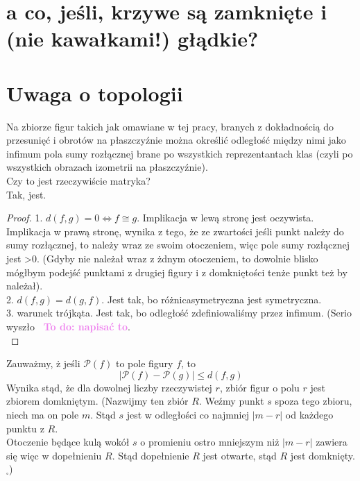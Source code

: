 \documentclass[a4paper, 12pt]{article}
\newcommand{\smalltodoII}[1]{\hfill \break \textbf{\ \textcolor{violet}{To do: #1}}\hfill \break}
\begin{document}
\section{a co, jeśli, krzywe są zamknięte i (nie kawałkami!) głądkie?}

\section{Uwaga o topologii}
Na zbiorze figur takich jak omawiane w tej pracy, branych z dokładnością do przesunięć i obrotów na
płaszczyźnie można określić odległość między nimi jako infimum pola sumy rozłącznej brane po wszystkich
reprezentantach klas (czyli po wszystkich obrazach izometrii na płaszczyźnie). \\
Czy to jest rzeczywiście matryka? \\
Tak, jest. \\
\begin{proof}
    1. $d(f,g) = 0 \iff f \cong g$. Implikacja w lewą stronę jest oczywista. Implikacja w prawą stronę,
    wynika z tego, że ze zwartości jeśli punkt należy do sumy rozłącznej, to należy wraz ze swoim otoczeniem,
     więc pole sumy rozłącznej jest >0. (Gdyby nie należał wraz z żdnym otoczeniem, to dowolnie blisko
     mógłbym podejść punktami z drugiej figury i z domkniętości tenże punkt też by należał). \\
     2. $d(f,g ) = d(g,f)$. Jest tak, bo różnicasymetryczna jest symetryczna. \\
     3. warunek trójkąta. Jest tak, bo odległość zdefiniowaliśmy przez infimum. (Serio wyszło
     \smalltodoII{napisać to}. \\

\end{proof}
Zauważmy, ż jeśli $\mathcal{P}(f)$ to pole figury $f$, to
\begin{equation}
    |\mathcal{P}(f) - \mathcal{P}(g)| \leq d(f, g)
\end{equation}
Wynika stąd, że dla dowolnej liczby rzeczywistej $r$, zbiór figur o polu $r$ jest zbiorem domkniętym.
(Nazwijmy ten zbiór $R$. Weźmy punkt $s$ spoza tego zbioru, niech ma on pole $m$.
Stąd $s$ jest w odległości co najmniej $|m-r|$ od każdego punktu z $R$. \\
Otoczenie będące kulą wokół $s$ o promieniu ostro mniejszym niż $|m - r|$ zawiera się więc w dopełnieniu $R$.
 Stąd dopełnienie $R$ jest otwarte, stąd $R$ jest domknięty. $_\square$)
\\
\end{document}
